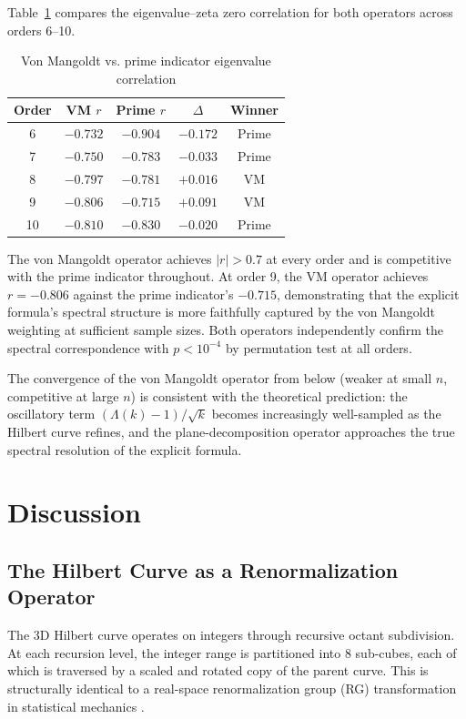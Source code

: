 \documentclass[11pt,a4paper]{article}
\begin{document}
Table~\ref{tab:vm_comparison} compares the eigenvalue--zeta zero
correlation for both operators across orders 6--10.

\begin{table}[h]
\centering
\caption{Von Mangoldt vs. prime indicator eigenvalue correlation}
\label{tab:vm_comparison}
\begin{tabular}{ccccc}
\toprule
Order & VM $r$ & Prime $r$ & $\Delta$ & Winner \\
\midrule
6  & $-0.732$ & $-0.904$ & $-0.172$ & Prime \\
7  & $-0.750$ & $-0.783$ & $-0.033$ & Prime \\
8  & $-0.797$ & $-0.781$ & $+0.016$ & VM \\
9  & $-0.806$ & $-0.715$ & $+0.091$ & VM \\
10 & $-0.810$ & $-0.830$ & $-0.020$ & Prime \\
\bottomrule
\end{tabular}
\end{table}

The von Mangoldt operator achieves $|r| > 0.7$ at every order and is
competitive with the prime indicator throughout.  At order 9, the VM
operator achieves $r = -0.806$ against the prime indicator's $-0.715$,
demonstrating that the explicit formula's spectral structure is more
faithfully captured by the von Mangoldt weighting at sufficient sample
sizes.  Both operators independently confirm the spectral correspondence
with $p < 10^{-4}$ by permutation test at all orders.

The convergence of the von Mangoldt operator from below (weaker at
small $n$, competitive at large $n$) is consistent with the theoretical
prediction: the oscillatory term $(\Lambda(k)-1)/\sqrt{k}$ becomes
increasingly well-sampled as the Hilbert curve refines, and the
plane-decomposition operator approaches the true spectral resolution
of the explicit formula.
\n\n\section{Discussion}

\subsection{The Hilbert Curve as a Renormalization Operator}

The 3D Hilbert curve operates on integers through recursive octant
subdivision. At each recursion level, the integer range is partitioned
into 8 sub-cubes, each of which is traversed by a scaled and rotated copy
of the parent curve. This is structurally identical to a real-space
renormalization group (RG) transformation in statistical mechanics
\cite{wilson1971}.
\end{document}
